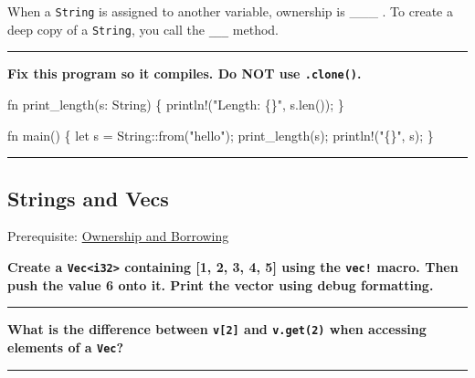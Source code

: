 \documentclass[
  11pt,
]{article}
\newenvironment{Shaded}{}{}
\newcommand{\NormalTok}[1]{#1}
\begin{document}
When a \texttt{String} is assigned to another variable, ownership is
\_\_\_ . To create a deep copy of a \texttt{String}, you call the
\texttt{\_\_\_} method.

\begin{center}\rule{0.5\linewidth}{0.5pt}\end{center}

\textbf{Fix this program so it compiles. Do NOT use \texttt{.clone()}.}

\begin{Shaded}
\begin{Highlighting}[]
\NormalTok{fn print\_length(s: String) \{}
\NormalTok{    println!("Length: \{\}", s.len());}
\NormalTok{\}}

\NormalTok{fn main() \{}
\NormalTok{    let s = String::from("hello");}
\NormalTok{    print\_length(s);}
\NormalTok{    println!("\{\}", s);}
\NormalTok{\}}
\end{Highlighting}
\end{Shaded}

\begin{center}\rule{0.5\linewidth}{0.5pt}\end{center}

\subsection{Strings and Vecs}\label{strings-and-vecs}

Prerequisite: \hyperref[ownership-and-borrowing]{Ownership and
Borrowing}

\textbf{Create a \texttt{Vec\textless{}i32\textgreater{}} containing
{[}1, 2, 3, 4, 5{]} using the \texttt{vec!} macro. Then push the value 6
onto it. Print the vector using debug formatting.}

\begin{Shaded}
\begin{Highlighting}[]

\end{Highlighting}
\end{Shaded}

\begin{center}\rule{0.5\linewidth}{0.5pt}\end{center}

\textbf{What is the difference between \texttt{v{[}2{]}} and
\texttt{v.get(2)} when accessing elements of a \texttt{Vec}?}

\begin{center}\rule{0.5\linewidth}{0.5pt}\end{center}
\end{document}
